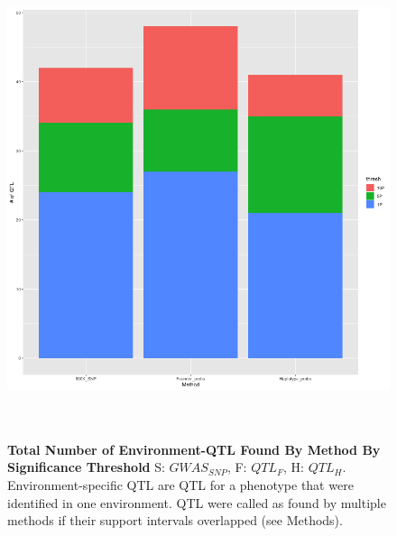 \documentclass[article,9pt,twocolumn,twoside]{rilabRxiv}
\begin{document}
\begin{figure}[ht]
\centering
\includegraphics[width=\textwidth,height=14cm]{figures/threshold_by_method_counts.png}
\caption{\textbf{Total Number of Environment-QTL Found By Method By Significance Threshold} S: $GWAS_{SNP}$, F: $QTL_F$, H: $QTL_H$. Environment-specific QTL are QTL for a phenotype that were identified in one environment. QTL were called as found by multiple methods if their support intervals overlapped (see Methods).}
\label{fig:supfigure3}
\end{figure}
\end{document}
